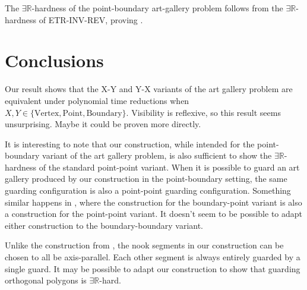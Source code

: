 \documentclass[11pt]{article}
\newcommand{\rr}{\mathbb R}
\theoremstyle{plain}
\theoremstyle{definition}
\numberwithin{theorem}{section}
\begin{document}
The $\exists\rr$-hardness of the point-boundary art-gallery problem follows from the $\exists\rr$-hardness of ETR-INV-REV, proving .

\section{Conclusions}\label{Conclusion}

Our result shows that the X-Y and Y-X variants of the art gallery problem are equivalent under polynomial time reductions when $X, Y\in \{\text{Vertex}, \text{Point}, \text{Boundary}\}$. Visibility is reflexive, so this result seems unsurprising. Maybe it could be proven more directly.

It is interesting to note that our construction, while intended for the point-boundary variant of the art gallery problem, is also sufficient to show the $\exists\rr$-hardness of the standard point-point variant. When it is possible to guard an art gallery produced by our construction in the point-boundary setting, the same guarding configuration is also a point-point guarding configuration. Something similar happens in \cite{ExistsRHardness}, where the construction for the boundary-point variant is also a construction for the point-point variant. It doesn't seem to be possible to adapt either construction to the boundary-boundary variant.

Unlike the construction from \cite{ExistsRHardness}, the nook segments in our construction can be chosen to all be axis-parallel. Each other segment is always entirely guarded by a single guard. It may be possible to adapt our construction to show that guarding orthogonal polygons is $\exists\rr$-hard.



\end{document}
